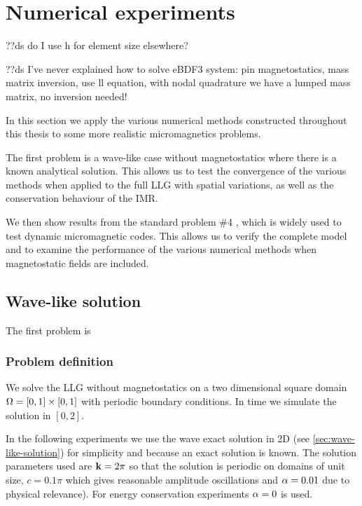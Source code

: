 \chapter{Numerical experiments}
\label{cha:numer-experiments}

??ds do I use h for element size elsewhere?

??ds I've never explained how to solve eBDF3 system: pin magnetostatics, mass matrix inversion, use ll equation, with nodal quadrature we have a lumped mass matrix, no inversion needed!


In this section we apply the various numerical methods constructed throughout this thesis to some more realistic micromagnetics problems.

The first problem is a wave-like case without magnetostatics where there is a known analytical solution.
This allows us to test the convergence of the various methods when applied to the full LLG with spatial variations, as well as the conservation behaviour of the IMR.

We then show results from the \mumag standard problem \#4 \cite{mumag-website}, which is widely used to test dynamic micromagnetic codes.
This allows us to verify the complete model and to examine the performance of the various numerical methods when magnetostatic fields are included.



\section{Wave-like solution}
\label{sec:numer-exper}

The first problem is

\subsection{Problem definition}

We solve the LLG without magnetostatics on a two dimensional square domain $\Omega = [0,1] \times [0,1]$ with periodic boundary conditions.
In time we simulate the solution in $[0, 2]$.

In the following experiments we use the wave exact solution in 2D (see \cref{sec:wave-like-solution}) for simplicity and because an exact solution is known.
The solution parameters used are $\boldsymbol{\mathrm{k}} = 2\pi$ so that the solution is periodic on domains of unit size, $c = 0.1\pi$ which gives reasonable amplitude oscillations and $\alpha = 0.01$ due to physical relevance).
For energy conservation experiments $\alpha = 0$ is used.


